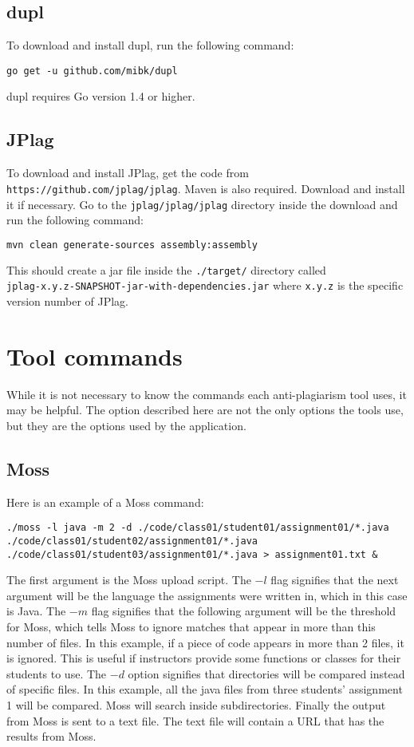 \documentclass[12pt]{article}
\begin{document}
		\subsection{dupl}
			To download and install dupl, run the following command:
			\begin{lstlisting}[breaklines=true]	
go get -u github.com/mibk/dupl
			\end{lstlisting}
			\noindent dupl requires Go version 1.4 or higher.
			
		\subsection{JPlag}
			To download and install JPlag, get the code from \\\verb|https://github.com/jplag/jplag|. Maven is also required. Download and install it if necessary. Go to the \verb|jplag/jplag/jplag| directory inside the download and run the following command:
			\begin{lstlisting}[language=bash]
mvn clean generate-sources assembly:assembly
			\end{lstlisting}
			This should create a jar file inside the \verb|./target/| directory called \\\verb|jplag-x.y.z-SNAPSHOT-jar-with-dependencies.jar| where \verb|x.y.z| is the specific version number of JPlag.
			
	\section{Tool commands}
		While it is not necessary to know the commands each anti-plagiarism tool uses, it may be helpful. The option described here are not the only options the tools use, but they are the options used by the application.
		
		\subsection{Moss}
			Here is an example of a Moss command:
			\begin{lstlisting}[breaklines=true]
./moss -l java -m 2 -d ./code/class01/student01/assignment01/*.java ./code/class01/student02/assignment01/*.java ./code/class01/student03/assignment01/*.java > assignment01.txt &
			\end{lstlisting}
			\noindent The first argument is the Moss upload script. The $-l$ flag signifies that the next argument will be the language the assignments were written in, which in this case is Java. The $-m$ flag signifies that the following argument will be the threshold for Moss, which tells Moss to ignore matches that appear in more than this number of files. In this example, if a piece of code appears in more than 2 files, it is ignored. This is useful if instructors provide some functions or classes for their students to use. The $-d$ option signifies that directories will be compared instead of specific files. In this example, all the java files from three students' assignment 1 will be compared. Moss will search inside subdirectories. Finally the output from Moss is sent to a text file. The text file will contain a URL that has the results from Moss.
			
\end{document}
